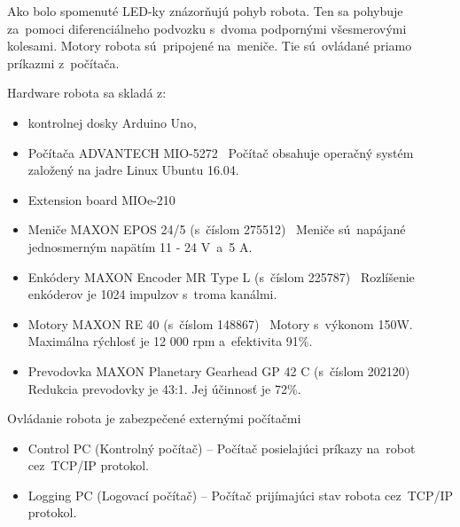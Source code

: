 Ako bolo spomenuté LED-ky znázorňujú pohyb robota. Ten sa pohybuje za~pomoci diferenciálneho podvozku s~dvoma podpornými všesmerovými kolesami.
Motory robota sú~pripojené na~meniče. Tie sú~ovládané priamo príkazmi z~počítača.

Hardware robota sa skladá z:
\begin{itemize}
	\item kontrolnej dosky Arduino Uno,

	\item Počítača ADVANTECH MIO-5272~\cite{robotPc} \newline
		Počítač obsahuje operačný systém založený na jadre Linux Ubuntu 16.04.

	\item Extension board MIOe-210~\cite{extensionModule}

	\item Meniče MAXON EPOS 24/5 (s~číslom 275512)~\cite{menic} \newline
	 	Meniče sú~napájané jednosmerným napätím 11 - 24 V~a~5 A.

	\item Enkódery MAXON Encoder MR Type L (s~číslom 225787)~\cite{encoder} \newline
		Rozlíšenie enkóderov je 1024 impulzov s~troma kanálmi.

	\item Motory MAXON RE 40 (s~číslom 148867)~\cite{motor} \newline
		Motory s~výkonom 150W. Maximálna rýchlosť je 12 000 rpm a~efektivita 91\%.

	\item Prevodovka MAXON Planetary Gearhead GP 42 C (s~číslom 202120)~\cite{prevodovka} \newline
		Redukcia prevodovky je 43:1. Jej účinnosť je 72\%.
\end{itemize}

\noindent Ovládanie robota je zabezpečené externými počítačmi
\begin{itemize}
	\item Control PC (Kontrolný počítač) -- Počítač posielajúci príkazy na~robot cez~TCP/IP protokol.
	\item Logging PC (Logovací počítač) -- Počítač prijímajúci stav robota cez~TCP/IP protokol.
\end{itemize}

